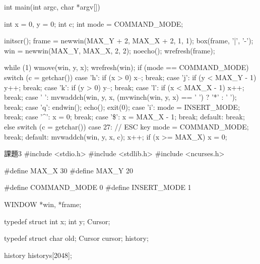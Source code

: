 \documentclass[a4paper,11pt]{jsarticle}
\begin{document}
int main(int argc, char *argv[])
{
    int x = 0, y = 0;
    int c;
    int mode = COMMAND_MODE;

    initscr();
    frame = newwin(MAX_Y + 2, MAX_X + 2, 1, 1);
    box(frame, '|', '-');
    win = newwin(MAX_Y, MAX_X, 2, 2);
    noecho();
    wrefresh(frame);

    while (1)
    {
        wmove(win, y, x);
        wrefresh(win);
        if (mode == COMMAND_MODE)
        {
            switch (c = getchar())
            {
            case 'h':
                if (x > 0)
                    x--;
                break;
            case 'j':
                if (y < MAX_Y - 1)
                    y++;
                break;
            case 'k':
                if (y > 0)
                    y--;
                break;
            case 'l':
                if (x < MAX_X - 1)
                    x++;
                break;
            case ' ':
                mvwaddch(win, y, x, (mvwinch(win, y, x) == ' ') ? '*' : ' ');
                break;
            case 'q':
                endwin();
                echo();
                exit(0);
            case 'i':
                mode = INSERT_MODE;
                break;
            case '^':
                x = 0;
                break;
            case '\$':
                x = MAX_X - 1;
                break;
            default:
                break;
            }
        }
        else
        {
            switch (c = getchar())
            {
            case 27: // ESC key
                mode = COMMAND_MODE;
                break;
            default:
                mvwaddch(win, y, x, c);
                x++;
                if (x >= MAX_X)
                    x = 0;
            }
        }
    }
}
課題3
#include <stdio.h>
#include <stdlib.h>
#include <ncurses.h>

#define MAX_X 30
#define MAX_Y 20

#define COMMAND_MODE 0
#define INSERT_MODE 1

WINDOW *win, *frame;

typedef struct 
{
    int x;
    int y;
} Cursor;


typedef struct{
    char old;
    Cursor cursor;
} history;

history historys[2048];
\end{document}
